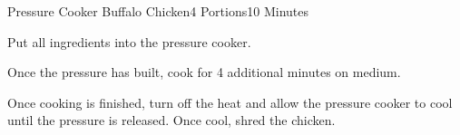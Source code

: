 \begin{recipe}{Pressure Cooker Buffalo Chicken}{4 Portions}{10 Minutes}

Put all ingredients into the pressure cooker.

\newstep
Once the pressure has built, cook for 4 additional minutes on medium.

\newstep
Once cooking is finished, turn off the heat and allow the pressure cooker to cool until the pressure is released. Once cool, shred the chicken.

\end{recipe}